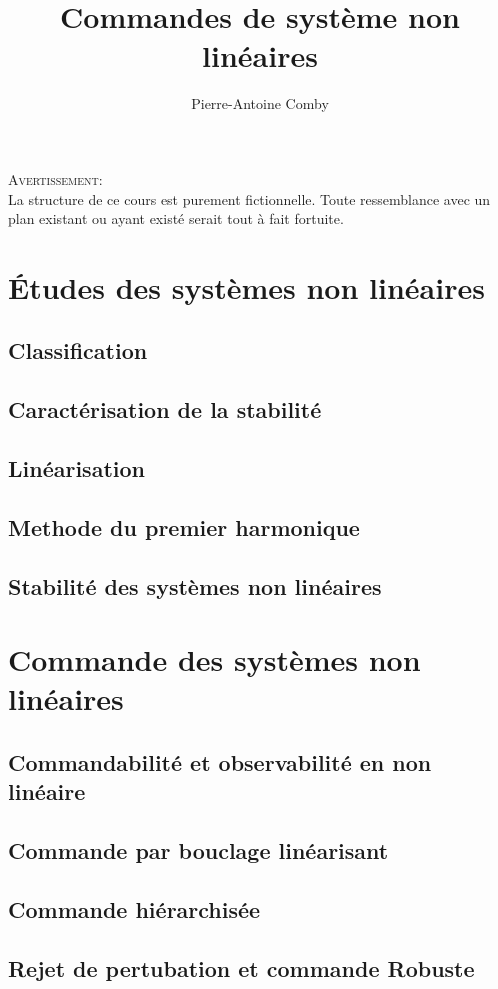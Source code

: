 \documentclass[openany]{../../cours}
\author{Pierre-Antoine Comby}
\title{Commandes de système non linéaires}
\begin{document}
\maketitle
\hfill
\begin{center}
  \textsc{Avertissement:}\\
  La structure de ce cours est purement fictionnelle. Toute ressemblance avec un plan existant ou ayant existé serait tout à fait fortuite.
\end{center}
\hfill
\newpage

\tableofcontents
\part{Études des systèmes non linéaires}
\chapter{Classification}

\chapter{Caractérisation de la stabilité}

\chapter{Linéarisation}

\chapter{Methode du premier harmonique}

\chapter{Stabilité des systèmes non linéaires}

\part{Commande des systèmes non linéaires}
\chapter{Commandabilité et observabilité en non linéaire}

\chapter{Commande par bouclage linéarisant}

\chapter{Commande hiérarchisée}

\chapter{Rejet de pertubation et commande Robuste}

\end{document}
